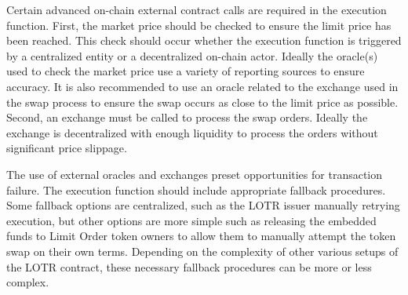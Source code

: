 \documentclass[12pt]{article}
\begin{document}
\begin{center}
            \end{center}
            Certain advanced on-chain external contract calls are required in the execution function. First, the market price should be checked to ensure the limit price has been reached. This check should occur whether the execution function is triggered by a centralized entity or a decentralized on-chain actor. Ideally the oracle(s) used to check the market price use a variety of reporting sources to ensure accuracy. It is also recommended to use an oracle related to the exchange used in the swap process to ensure the swap occurs as close to the limit price as possible. Second, an exchange must be called to process the swap orders. Ideally the exchange is decentralized with enough liquidity to process the orders without significant price slippage.

            The use of external oracles and exchanges preset opportunities for transaction failure. The execution function should include appropriate fallback procedures. Some fallback options are centralized, such as the LOTR issuer manually retrying execution, but other options are more simple such as releasing the embedded funds to Limit Order token owners to allow them to manually attempt the token swap on their own terms. Depending on the complexity of other various setups of the LOTR contract, these necessary fallback procedures can be more or less complex.
            
\end{document}
